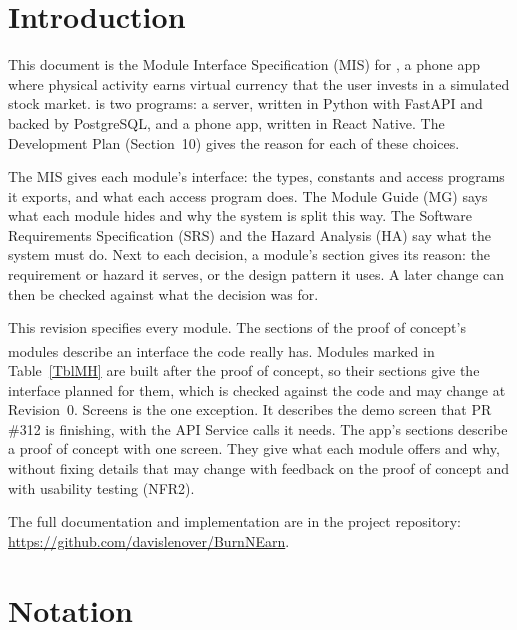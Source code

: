 \documentclass[12pt, titlepage]{article}
\begin{document}
\newpage

\tableofcontents

\newpage


\section{Introduction}

This document is the Module Interface Specification (MIS) for \progname{}, a
phone app where physical activity earns virtual currency that the user invests
in a simulated stock market. \progname{} is two programs: a server, written in
Python with FastAPI and backed by PostgreSQL, and a phone app, written in React
Native. The Development Plan (Section~10) gives the reason for each of these
choices.

The MIS gives each module's interface: the types, constants and access programs
it exports, and what each access program does. The Module Guide (MG) says what
each module hides and why the system is split this way. The Software
Requirements Specification (SRS) and the Hazard Analysis (HA) say what the
system must do. Next to each decision, a module's section gives its reason: the
requirement or hazard it serves, or the design pattern it uses. A later change
can then be checked against what the decision was for.

This revision specifies every module. The sections of the proof of concept's
modules describe an interface the code really has. Modules marked
\textsuperscript{\dag} in Table~\ref{TblMH} are built after the proof of
concept, so their sections give the interface planned for them, which is
checked against the code and may change at Revision~0. Screens is the one exception. It describes the demo screen that
PR \#312 is finishing, with the API Service calls it needs. The app's sections
describe a proof of concept with one screen.
They give what each module offers and why, without fixing details that may
change with feedback on the proof of concept and with usability testing (NFR2).

The full documentation and implementation are in the project repository:
\url{https://github.com/davislenover/BurnNEarn}.

\newpage

\section{Notation}
\end{document}
